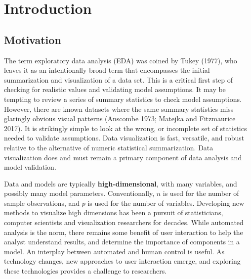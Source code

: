 \documentclass[
  11,
]{article}
\begin{document}
\newpage

% 

\doublespacing

\newpage
{}
\hypersetup{linkcolor = blue}

{
\hypersetup{linkcolor=}
\setcounter{tocdepth}{2}
\tableofcontents
}
\hypertarget{sec:intro}{%
\section{Introduction}\label{sec:intro}}

\hypertarget{motivation}{%
\subsection{Motivation}\label{motivation}}

The term exploratory data analysis (EDA) was coined by Tukey (1977), who leaves it as an intentionally broad term that encompasses the initial summarization and visualization of a data set. This is a critical first step of checking for realistic values and validating model assumptions. It may be tempting to review a series of summary statistics to check model assumptions. However, there are known datasets where the same summary statistics miss glaringly obvious visual patterns (Anscombe 1973; Matejka and Fitzmaurice 2017). It is strikingly simple to look at the wrong, or incomplete set of statistics needed to validate assumptions. Data visualization is fast, versatile, and robust relative to the alternative of numeric statistical summarization. Data visualization does and must remain a primary component of data analysis and model validation.

Data and models are typically \textbf{high-dimensional}, with many variables, and possibly many model parameters. Conventionally, \(n\) is used for the number of sample observations, and \(p\) is used for the number of variables. Developing new methods to visualize high dimensions has been a pursuit of statisticians, computer scientists and visualization researchers for decades. While automated analysis is the norm, there remains some benefit of user interaction to help the analyst understand results, and determine the importance of components in a model. An interplay between automated and human control is useful. As technology changes, new approaches to user interaction emerge, and exploring these technologies provides a challenge to researchers.
\end{document}
